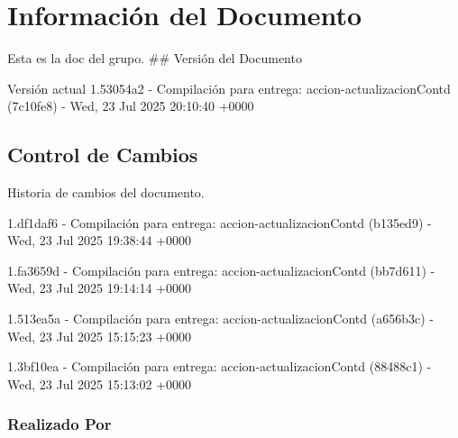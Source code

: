 \documentclass[
	a4paper, %
	12pt, %
]{include/CSSullivanBusinessReport}
\begin{document}
\newpage

\begin{twothirdswidth} %
	\tableofcontents %
\end{twothirdswidth}

\newpage


\newpage

\section{Información del
Documento}\label{sec:informaciuxf3n-del-documento}

Esta es la doc del grupo. \#\# Versión del Documento

\begin{quote}
\end{quote}

Versión actual 1.53054a2 - Compilación para entrega:
accion-actualizacionContd (7c10fe8) - Wed, 23 Jul 2025 20:10:40 +0000

\subsection{Control de Cambios}\label{sec:control-de-cambios}

Historia de cambios del documento.

1.df1daf6 - Compilación para entrega: accion-actualizacionContd
(b135ed9) - Wed, 23 Jul 2025 19:38:44 +0000

1.fa3659d - Compilación para entrega: accion-actualizacionContd
(bb7d611) - Wed, 23 Jul 2025 19:14:14 +0000

1.513ea5a - Compilación para entrega: accion-actualizacionContd
(a656b3c) - Wed, 23 Jul 2025 15:15:23 +0000

1.3bf10ea - Compilación para entrega: accion-actualizacionContd
(88488c1) - Wed, 23 Jul 2025 15:13:02 +0000

\subsubsection{Realizado Por}\label{sec:realizado-por}
\end{document}
